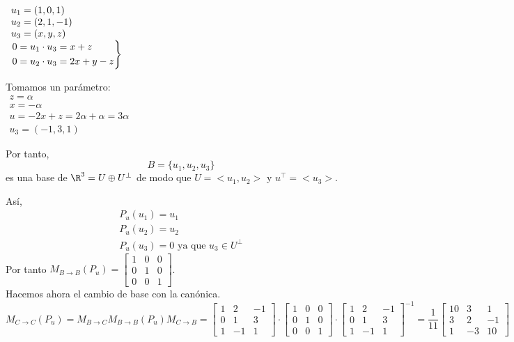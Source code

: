 \begin{enumerate}[label=\color{lightblue}\arabic*)]
	$\begin{array}{l}
		u_1=(1,0,1)\\
		u_2=(2,1,-1)\\
		u_3=(x,y,z)\\
		\begin{rcases}
			0=u_1\cdot u_3=x+z\\
			0=u_2\cdot u_3=2x+y-z
		\end{rcases}\\
	\end{array}$
	
	Tomamos un parámetro:\\
	$\begin{array}{l}
		z=\alpha\\
		x=-\alpha\\
		u=-2x+z=2\alpha+\alpha=3\alpha\\
		u_3=(-1,3,1)
	\end{array}$
	
	Por tanto, \[ B=\{u_1,u_2,u_3\} \]es una base de $\R^3=U\oplus U^\perp$ de modo que $U=<u_1,u_2>$ y $u^\intercal=<u_3>$.
	
	Así, \[ \begin{array}{l}
		P_u(u_1)=u_1\\
		P_u(u_2)=u_2\\
		P_u(u_3)=0\text{ ya que }u_3\in U^\perp
	\end{array} \]
	Por tanto $M_{B\to B}(P_u)=\begin{bmatrix}
		1 & 0 & 0 \\
		0 & 1 & 0 \\
		0 & 0 & 1
	\end{bmatrix}$.\\
	Hacemos ahora el cambio de base con la canónica.\\
	$M_{C\to C}(P_u)=M_{B\to C}M_{B\to B}(P_u)M_{C\to B}=\begin{bmatrix}
		1 & 2 & -1 \\
		0 & 1 & 3 \\
		1 & -1 & 1
	\end{bmatrix}\cdot\begin{bmatrix}
		1 & 0 & 0 \\
		0 & 1 & 0 \\
		0 & 0 & 1
	\end{bmatrix}\cdot\begin{bmatrix}
		1 & 2 & -1 \\
		0 & 1 & 3 \\
		1 & -1 & 1
	\end{bmatrix}^{-1}=\dfrac{1}{11}
	\begin{bmatrix}
		10 & 3 & 1 \\
		3 & 2 & -1 \\
		1 & -3 & 10
	\end{bmatrix}$
\end{enumerate}
